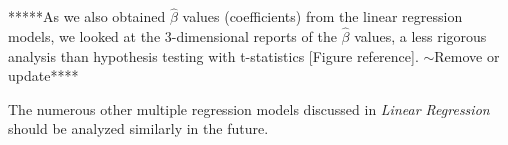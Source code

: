 
*****As we also obtained $\hat{\beta}$ values (coefficients) from the linear 
regression models, we looked at the 3-dimensional reports of the 
$\hat{\beta}$ values, a less rigorous analysis than hypothesis testing with 
t-statistics [Figure reference]. $\sim$Remove or update****



The numerous other multiple regression models discussed in 
\textit{Linear Regression} should be analyzed similarly in the future. 
